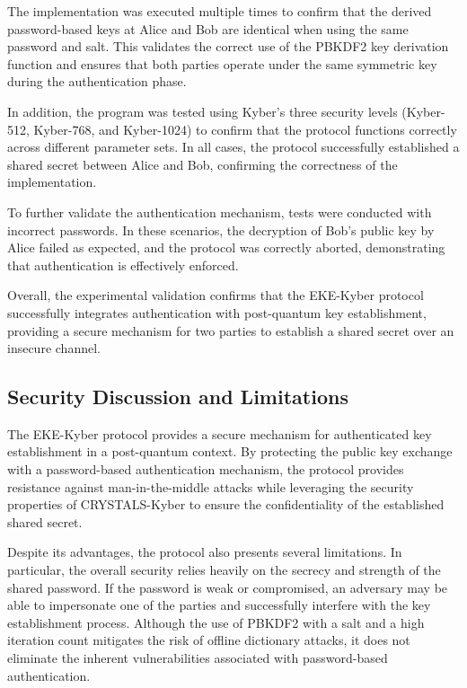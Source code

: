\documentclass[12pt]{article}
\begin{document}
The implementation was executed multiple times to confirm that the derived password-based keys at Alice and Bob are identical when using the same password and salt. This validates the correct use of the PBKDF2 key derivation function and ensures that both parties operate under the same symmetric key during the authentication phase.

In addition, the program was tested using Kyber's three security levels (Kyber-512, Kyber-768, and Kyber-1024) to confirm that the protocol functions correctly across different parameter sets. In all cases, the protocol successfully established a shared secret between Alice and Bob, confirming the correctness of the implementation.

To further validate the authentication mechanism, tests were conducted with incorrect passwords. In these scenarios, the decryption of Bob's public key by Alice failed as expected, and the protocol was correctly aborted, demonstrating that authentication is effectively enforced.

Overall, the experimental validation confirms that the EKE-Kyber protocol successfully integrates authentication with post-quantum key establishment, providing a secure mechanism for two parties to establish a shared secret over an insecure channel.


\subsection{Security Discussion and Limitations}

The EKE-Kyber protocol provides a secure mechanism for authenticated key establishment in a post-quantum context. By protecting the public key exchange with a password-based authentication mechanism, the protocol provides resistance against man-in-the-middle attacks while leveraging the security properties of CRYSTALS-Kyber to ensure the confidentiality of the established shared secret.

Despite its advantages, the protocol also presents several limitations. In particular, the overall security relies heavily on the secrecy and strength of the shared password. If the password is weak or compromised, an adversary may be able to impersonate one of the parties and successfully interfere with the key establishment process. Although the use of PBKDF2 with a salt and a high iteration count mitigates the risk of offline dictionary attacks, it does not eliminate the inherent vulnerabilities associated with password-based authentication.
\end{document}
